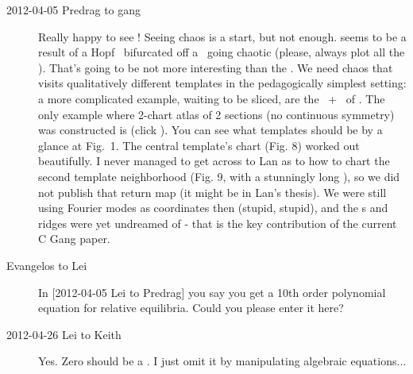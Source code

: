 \begin{description}
\item[2012-04-05 Predrag to {\twoMode} gang] Really happy to see
! Seeing chaos is a start, but not enough.
 seems to be a result of a Hopf \rpo\
bifurcated off a \reqv\ going chaotic (please, always plot all the
\reqva). That's going to be not more interesting than the \cLf. We need
chaos that visits qualitatively different templates in the pedagogically
simplest setting: a more complicated example, waiting to be sliced, are
the \eqva\ + \reqva\ of \refref{SCD07}. The only example where 2-chart
atlas of 2 sections (no continuous symmetry) was constructed is
 (click
).
You can see what templates should be by a glance at Fig.~1. The central
template's chart (Fig. 8) worked out beautifully. I never managed to get
across to Lan as to how to chart the second template neighborhood (Fig.
9, with a stunningly long \po), so we did not publish that return map (it
might be in Lan's thesis). We were still using Fourier modes as
coordinates then (stupid, stupid), and the \poincBord s and ridges were
yet undreamed of - that is the key contribution of the current C Gang
paper.

\item[Evangelos to Lei] In  [2012-04-05 Lei to Predrag] you say you get a
10th order polynomial equation for relative equilibria. Could you please
enter it here?

\item[2012-04-26 Lei to Keith] Yes. Zero should be a \eqv. I just
omit it by manipulating algebraic equations...

%


\end{description}
